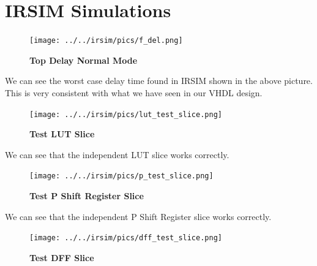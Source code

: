 \documentclass[a4paper]{article}
\newcommand{\tildep}{\raise.17ex\hbox{$\scriptstyle\sim$}}
\begin{document}

\section{\textbf{IRSIM Simulations}}

    \begin{figure}[H]
        \centering
        \texttt{[image: ../../irsim/pics/f\_del.png]}
        \caption{\textbf{Top Delay Normal Mode}}
        \label{fig:gg}
    \end{figure}

    We can see the worst case delay time found in IRSIM shown in the above picture. This is very consistent with
    what we have seen in our VHDL design.

    \begin{figure}[H]
        \centering
        \texttt{[image: ../../irsim/pics/lut\_test\_slice.png]}
        \caption{\textbf{Test LUT Slice}}
        \label{fig:gg}
    \end{figure}

    We can see that the independent LUT slice works correctly.

    \begin{figure}[H]
        \centering
        \texttt{[image: ../../irsim/pics/p\_test\_slice.png]}
        \caption{\textbf{Test P Shift Register Slice}}
        \label{fig:gg}
    \end{figure}

    We can see that the independent P Shift Register slice works correctly.

    \begin{figure}[H]
        \centering
        \texttt{[image: ../../irsim/pics/dff\_test\_slice.png]}
        \caption{\textbf{Test DFF Slice}}
        \label{fig:gg}
    \end{figure}
\end{document}
